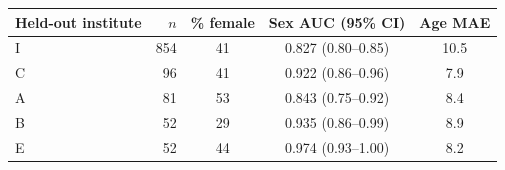 \begin{tabular}{lrccc}
\toprule
Held-out institute & $n$ & \% female & Sex AUC (95\% CI) & Age MAE \\
\midrule
I & 854 & 41 & 0.827 (0.80--0.85) & 10.5 \\
C & 96 & 41 & 0.922 (0.86--0.96) & 7.9 \\
A & 81 & 53 & 0.843 (0.75--0.92) & 8.4 \\
B & 52 & 29 & 0.935 (0.86--0.99) & 8.9 \\
E & 52 & 44 & 0.974 (0.93--1.00) & 8.2 \\
\bottomrule
\end{tabular}
